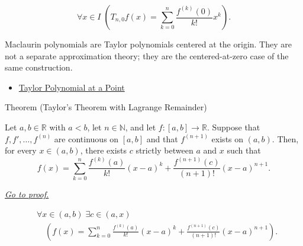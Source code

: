 \begin{remark*}
\[
\forall x\in I\;
\left(
  T_{n,0}f(x)=\sum_{k=0}^{n}\frac{f^{(k)}(0)}{k!}x^k
\right).
\]
\end{remark*}

\begin{remark*}[Interpretation]
Maclaurin polynomials are Taylor polynomials centered at the origin. They are
not a separate approximation theory; they are the centered-at-zero case of
the same construction.
\end{remark*}

\begin{remark*}[Dependencies]\hfill
\begin{itemize}
  \item \hyperref[def:taylor-polynomial-at-a-point]{Taylor Polynomial at a Point}
\end{itemize}
\end{remark*}


\begin{theorembox}{Theorem (Taylor's Theorem with Lagrange Remainder)}
\begin{theorem}
\label{thm:taylor-theorem-lagrange-remainder}
Let $a,b\in\mathbb{R}$ with $a<b$, let $n\in\mathbb{N}$, and let
$f:[a,b]\to\mathbb{R}$. Suppose that $f,f',\ldots,f^{(n)}$ are continuous
on $[a,b]$ and that $f^{(n+1)}$ exists on $(a,b)$. Then, for every
$x\in(a,b)$, there exists $c$ strictly between $a$ and $x$ such that
\[
  f(x)
  =
  \sum_{k=0}^{n}\frac{f^{(k)}(a)}{k!}(x-a)^k
  +
  \frac{f^{(n+1)}(c)}{(n+1)!}(x-a)^{n+1}.
\]

\smallskip
\noindent
\hyperref[prf:taylor-theorem-lagrange-remainder]{\textit{Go to proof.}}
\end{theorem}
\end{theorembox}

\begin{remark*}
\[
\begin{aligned}
&\forall x\in(a,b)\;\exists c\in(a,x)\\
&\quad
\left(
  f(x)
  =
  \sum_{k=0}^{n}\frac{f^{(k)}(a)}{k!}(x-a)^k
  +
  \frac{f^{(n+1)}(c)}{(n+1)!}(x-a)^{n+1}
\right).
\end{aligned}
\]
\end{remark*}

